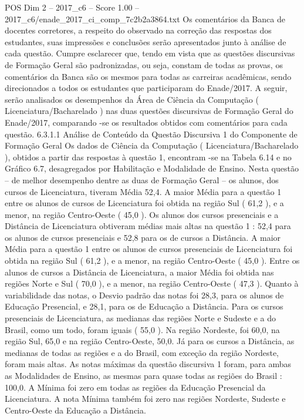 \begin{textsample}{POS Dim 2 – 2017\_c6 – Score 1.00 – 2017\_c6/enade\_2017\_ci\_comp\_7c2b2a3864.txt}
Os comentários da Banca de docentes corretores, a respeito do observado na correção das respostas dos estudantes, suas impressões e conclusões serão apresentados junto à análise de cada questão.
Cumpre esclarecer que, tendo em vista que as questões discursivas de Formação Geral são padronizadas, ou seja, constam de todas as provas, os comentários da Banca são os mesmos para todas as carreiras acadêmicas, sendo direcionados a todos os estudantes que participaram do Enade/2017.
A seguir, serão analisados os desempenhos da Área de Ciência da Computação ( Licenciatura/Bacharelado ) nas duas questões discursivas de Formação Geral do Enade/2017, comparando -se os resultados obtidos com comentários para cada questão. 6.3.1.1 Análise de Conteúdo da Questão Discursiva 1 do Componente de Formação Geral Os dados de Ciência da Computação ( Licenciatura/Bacharelado ), obtidos a partir das respostas à questão 1, encontram -se na Tabela 6.14 e no Gráfico 6.7, desagregados por Habilitação e Modalidade de Ensino.
Nesta questão – de melhor desempenho dentre as duas de Formação Geral – os alunos, dos cursos de Licenciatura, tiveram Média 52,4.
A maior Média para a questão 1 entre os alunos de cursos de Licenciatura foi obtida na região Sul ( 61,2 ), e a menor, na região Centro-Oeste ( 45,0 ).
Os alunos dos cursos presenciais e a Distância de Licenciatura obtiveram médias mais altas na questão 1 : 52,4 para os alunos de cursos presenciais e 52,8 para os de cursos a Distância.
A maior Média para a questão 1 entre os alunos de cursos presenciais de Licenciatura foi obtida na região Sul ( 61,2 ), e a menor, na região Centro-Oeste ( 45,0 ).
Entre os alunos de cursos a Distância de Licenciatura, a maior Média foi obtida nas regiões Norte e Sul ( 70,0 ), e a menor, na região Centro-Oeste ( 47,3 ).
Quanto à variabilidade das notas, o Desvio padrão das notas foi 28,3, para os alunos de Educação Presencial, e 28,1, para os de Educação a Distância.
Para os cursos presenciais de Licenciatura, as medianas das regiões Norte e Sudeste e a do Brasil, como um todo, foram iguais ( 55,0 ).
Na região Nordeste, foi 60,0, na região Sul, 65,0 e na região Centro-Oeste, 50,0.
Já para os cursos a Distância, as medianas de todas as regiões e a do Brasil, com exceção da região Nordeste, foram mais altas.
As notas máximas da questão discursiva 1 foram, para ambas as Modalidades de Ensino, as mesmas para quase todas as regiões do Brasil : 100,0.
A Mínima foi zero em todas as regiões da Educação Presencial da Licenciatura.
A nota Mínima também foi zero nas regiões Nordeste, Sudeste e Centro-Oeste da Educação a Distância.

\end{textsample}
